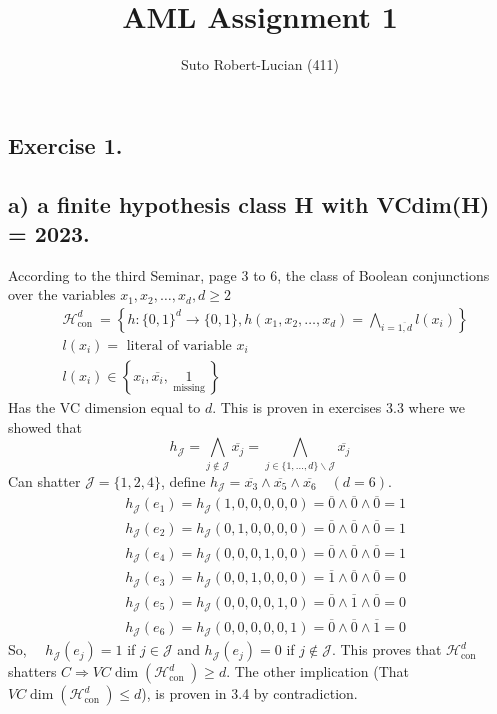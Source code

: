 \documentclass[11pt, a4paper]{article}
\title{AML Assignment 1}
\author{Suto Robert-Lucian (411)}
\date{}
\begin{document}
\maketitle
\begin{large}

\section{Exercise 1.}
\subsection{a) a finite hypothesis class H with VCdim(H) = 2023.}
According to the third Seminar, page 3 to 6, the class of Boolean conjunctions over the variables $x_1, x_2, \dots, x_d, d \geq 2$
$$
\begin{aligned}
& \mathcal{H}_{\text {con }}^d=\left\{h:\{0,1\}^d \rightarrow\{0,1\}, h\left(x_1, x_2, \ldots, x_d\right)=\bigwedge_{i=\overline{1, d}} l\left(x_i\right)\right\} \\
& l\left(x_i\right)=\text { literal of variable } x_i \\
& l\left(x_i\right) \in\left\{x_i, \overline{x_i}, \underset{\text { missing }}{1}\right\}
\end{aligned}
$$
Has the VC dimension equal to $d$. This is proven in exercises 3.3 where we showed that 
$$
h_{\mathcal{J}}=\bigwedge_{j \notin \mathcal{J}} \overline{x_j}=\bigwedge_{j \in\{1, \ldots, d\} \backslash \mathcal{J}} \overline{x_j}
$$
Can shatter $\mathcal{J}=\{1,2,4\}$, define $h_{\mathcal{J}}=\overline{x_3} \wedge \overline{x_5} \wedge \overline{x_6} \quad(d=6)$.
$$
\begin{aligned}
& h_{\mathcal{J}}\left(e_1\right)=h_{\mathcal{J}}(1,0,0,0,0,0)=\overline{0} \wedge \overline{0} \wedge \overline{0}=1 \\
& h_{\mathcal{J}}\left(e_2\right)=h_{\mathcal{J}}(0,1,0,0,0,0)=\overline{0} \wedge \overline{0} \wedge \overline{0}=1 \\
& h_{\mathcal{J}}\left(e_4\right)=h_{\mathcal{J}}(0,0,0,1,0,0)=\overline{0} \wedge \overline{0} \wedge \overline{0}=1 \\
& h_{\mathcal{J}}\left(e_3\right)=h_{\mathcal{J}}(0,0,1,0,0,0)=\overline{1} \wedge \overline{0} \wedge \overline{0}=0 \\
& h_{\mathcal{J}}\left(e_5\right)=h_{\mathcal{J}}(0,0,0,0,1,0)=\overline{0} \wedge \overline{1} \wedge \overline{0}=0 \\
& h_{\mathcal{J}}\left(e_6\right)=h_{\mathcal{J}}(0,0,0,0,0,1)=\overline{0} \wedge \overline{0} \wedge \overline{1}=0
\end{aligned}
$$
So, $\quad h_{\mathcal{J}}\left(e_j\right)=1$ if $j \in \mathcal{J}$ and $h_{\mathcal{J}}\left(e_j\right)=0$ if $j \notin \mathcal{J}$.
This proves that $\mathcal{H}_{\text {con }}^d$ shatters $C \Rightarrow V C \operatorname{dim}\left(\mathcal{H}_{\text {con }}^d\right) \geq d$.
The other implication (That  $V C \operatorname{dim}\left(\mathcal{H}_{\text {con }}^d\right) \leq d$), is proven in 3.4 by contradiction.


\end{large}
\end{document}
